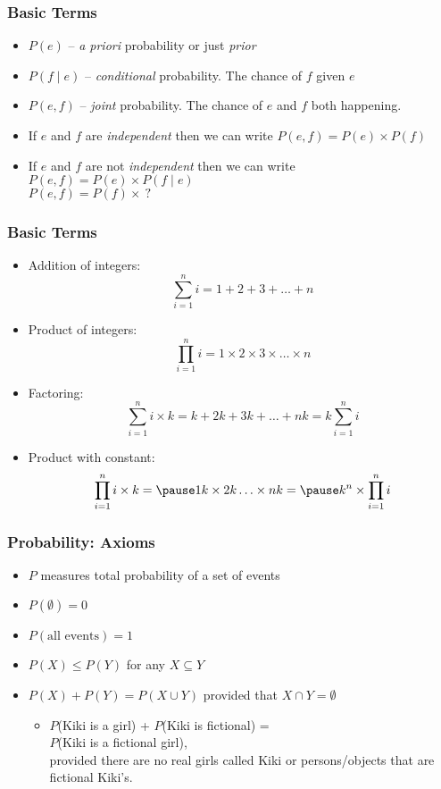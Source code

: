 \documentclass[handout]{beamer}
\begin{document}
\begin{frame}
\frametitle{Basic Terms}
\begin{itemize}[<+->]
\item $P(e)$ -- {\em a priori} probability or just {\em prior}
\item $P(f \mid e)$ -- {\em conditional} probability. The chance of
  $f$ given $e$
\item $P(e, f)$ -- {\em joint} probability. The chance of $e$ and $f$
  both happening.
\item If $e$ and $f$ are {\em independent} then we can write $P(e,f) =
  P(e) \times P(f)$
\item If $e$ and $f$ are not {\em independent} then we can write
  $P(e,f) = P(e) \times P(f \mid e)$ \\
 $P(e,f) = P(f) \times\ ?$
\end{itemize}

\end{frame}

\begin{frame}
\frametitle{Basic Terms}
\begin{itemize}[<+->]
\item Addition of integers: \[ \sum_{i=1}^n i = 1 + 2 + 3 + \ldots +
  n \]
\item Product of integers: \[ \prod_{i=1}^n i = 1 \times 2 \times 3
  \times \ldots \times n \]
\item Factoring: \[ \sum_{i=1}^n i \times k = k + 2k + 3k + \ldots + nk
  = k \sum_{i=1}^n i \]
\item Product with constant: \[ \prod_{i=1}^n i \times k = \pause 1 k \times 2 k \ldots \times n k = \pause k^n \times \prod_{i=1}^n i \]
\end{itemize}

\end{frame}

\begin{frame}
\frametitle{Probability: Axioms}
\begin{itemize}[<+->]
\item $P$ measures total probability of a set of events
\item $P(\emptyset) = 0$
\item $P(\mbox{all events}) = 1$
\item $P(X) \leq P(Y)$ for any $X \subseteq Y$
\item $P(X) + P(Y) = P(X \cup Y)$ provided that $X \cap Y = \emptyset$
\begin{itemize}
\item $P$(Kiki is a girl) + $P$(Kiki is fictional) = \\
$P$(Kiki is a fictional girl), \\
provided there are no real girls called Kiki or persons/objects that are fictional Kiki's.
\end{itemize}

\end{itemize}

\end{frame}
\end{document}
